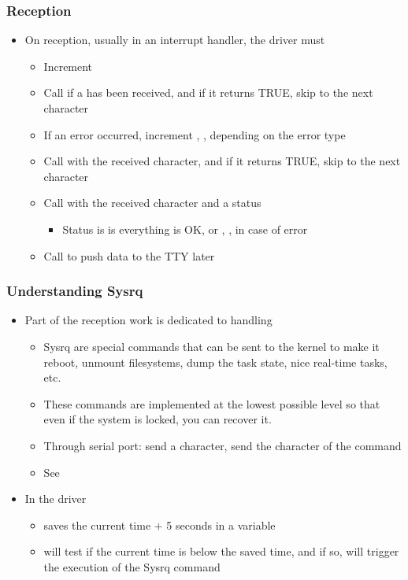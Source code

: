 \begin{frame}
  \frametitle{Reception}
  \begin{itemize}
  \item On reception, usually in an interrupt handler, the driver must
    \begin{itemize}
    \item Increment 
    \item Call  if a  has been
      received, and if it returns TRUE, skip to the next character
    \item If an error occurred, increment ,
      ,  depending
      on the error type
    \item Call  with the received
      character, and if it returns TRUE, skip to the next character
    \item Call  with the received character
      and a status
      \begin{itemize}
      \item Status is  is everything is OK, or
        , ,  in case
        of error
      \end{itemize}
    \item Call  to push data to the TTY
      later
    \end{itemize}
  \end{itemize}
\end{frame}

\begin{frame}
  \frametitle{Understanding Sysrq}
  \begin{itemize}
  \item Part of the reception work is dedicated to handling
    \begin{itemize}
    \item Sysrq are special commands that can be sent to the kernel to
      make it reboot, unmount filesystems, dump the task state, nice
      real-time tasks, etc.
    \item These commands are implemented at the lowest possible level
      so that even if the system is locked, you can recover it.
    \item Through serial port: send a  character, send the
      character of the  command
    \item See 
    \end{itemize}
  \item In the driver
    \begin{itemize}
    \item {} saves the current time + 5
      seconds in a variable
    \item {} will test if the current
      time is below the saved time, and if so, will trigger the
      execution of the Sysrq command
    \end{itemize}
  \end{itemize}
\end{frame}

